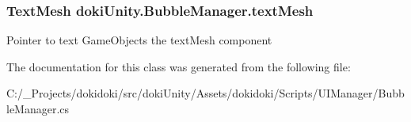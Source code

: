 \subsubsection[{\texorpdfstring{text\+Mesh}{textMesh}}]{\setlength{\rightskip}{0pt plus 5cm}Text\+Mesh doki\+Unity.\+Bubble\+Manager.\+text\+Mesh}\hypertarget{classdoki_unity_1_1_bubble_manager_acde82ad6bddebc164ffb6965fe7b95bd}{}\label{classdoki_unity_1_1_bubble_manager_acde82ad6bddebc164ffb6965fe7b95bd}


Pointer to text Game\+Object\textquotesingle{}s the text\+Mesh component 



The documentation for this class was generated from the following file\+:\begin{DoxyCompactItemize}
\item 
C\+:/\+\_\+\+Projects/dokidoki/src/doki\+Unity/\+Assets/dokidoki/\+Scripts/\+U\+I\+Manager/Bubble\+Manager.\+cs\end{DoxyCompactItemize}

